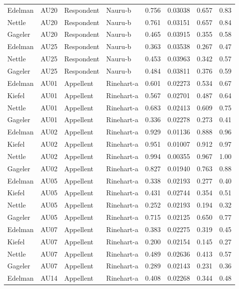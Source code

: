 \documentclass{monashthesis}
\begin{document}
\begin{center}
\begin{longtable}{llllllll}
Edelman & AU20 & Respondent & Nauru-b & 0.756 & 0.03038 & 0.657 & 0.83 \\
Nettle & AU20 & Respondent & Nauru-b & 0.761 & 0.03151 & 0.657 & 0.84 \\
Gageler & AU20 & Respondent & Nauru-b & 0.465 & 0.03915 & 0.355 & 0.58 \\
Edelman & AU25 & Respondent & Nauru-b & 0.363 & 0.03538 & 0.267 & 0.47 \\
Nettle & AU25 & Respondent & Nauru-b & 0.453 & 0.03963 & 0.342 & 0.57 \\
Gageler & AU25 & Respondent & Nauru-b & 0.484 & 0.03811 & 0.376 & 0.59 \\
Edelman & AU01 & Appellent & Rinehart-a & 0.601 & 0.02273 & 0.534 & 0.67 \\
Kiefel & AU01 & Appellent & Rinehart-a & 0.567 & 0.02701 & 0.487 & 0.64 \\
Nettle & AU01 & Appellent & Rinehart-a & 0.683 & 0.02413 & 0.609 & 0.75 \\
Gageler & AU01 & Appellent & Rinehart-a & 0.336 & 0.02278 & 0.273 & 0.41 \\
Edelman & AU02 & Appellent & Rinehart-a & 0.929 & 0.01136 & 0.888 & 0.96 \\
Kiefel & AU02 & Appellent & Rinehart-a & 0.951 & 0.01007 & 0.912 & 0.97 \\
Nettle & AU02 & Appellent & Rinehart-a & 0.994 & 0.00355 & 0.967 & 1.00 \\
Gageler & AU02 & Appellent & Rinehart-a & 0.827 & 0.01940 & 0.763 & 0.88 \\
Edelman & AU05 & Appellent & Rinehart-a & 0.338 & 0.02193 & 0.277 & 0.40 \\
Kiefel & AU05 & Appellent & Rinehart-a & 0.431 & 0.02744 & 0.354 & 0.51 \\
Nettle & AU05 & Appellent & Rinehart-a & 0.252 & 0.02193 & 0.194 & 0.32 \\
Gageler & AU05 & Appellent & Rinehart-a & 0.715 & 0.02125 & 0.650 & 0.77 \\
Edelman & AU07 & Appellent & Rinehart-a & 0.383 & 0.02275 & 0.319 & 0.45 \\
Kiefel & AU07 & Appellent & Rinehart-a & 0.200 & 0.02154 & 0.145 & 0.27 \\
Nettle & AU07 & Appellent & Rinehart-a & 0.489 & 0.02636 & 0.413 & 0.57 \\
Gageler & AU07 & Appellent & Rinehart-a & 0.289 & 0.02143 & 0.231 & 0.36 \\
Edelman & AU14 & Appellent & Rinehart-a & 0.408 & 0.02268 & 0.344 & 0.48 \\

\end{longtable}
\end{center}
\end{document}
